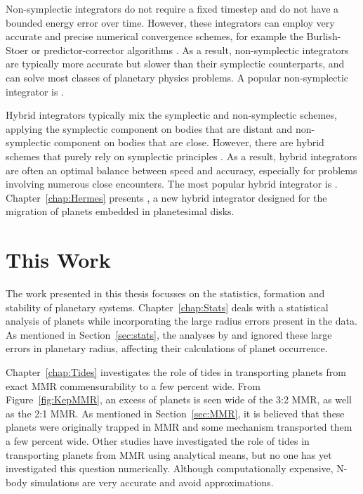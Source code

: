 Non-symplectic integrators do not require a fixed timestep and do not have a bounded energy error over time. 
However, these integrators can employ very accurate and precise numerical convergence schemes, for example the Burlish-Stoer or predictor-corrector algorithms \citep{Press2002}.
As a result, non-symplectic integrators are typically more accurate but slower than their symplectic counterparts, and can solve most classes of planetary physics problems. 
A popular non-symplectic integrator is \ias \citep{Rein2015a}.

Hybrid integrators typically mix the symplectic and non-symplectic schemes, applying the symplectic component on bodies that are distant and non-symplectic component on bodies that are close. 
However, there are hybrid schemes that purely rely on symplectic principles \citep[e.g.][]{Duncan1998}.
As a result, hybrid integrators are often an optimal balance between speed and accuracy, especially for problems involving numerous close encounters. 
The most popular hybrid integrator is \mercury \citep{Chambers1999}.
Chapter~\ref{chap:Hermes} presents \hermes, a new hybrid integrator designed for the migration of planets embedded in planetesimal disks. 

\section{This Work}
The work presented in this thesis focusses on the statistics, formation and stability of planetary systems. 
Chapter~\ref{chap:Stats} deals with a statistical analysis of \kep planets while incorporating the large radius errors present in the \kep data. 
As mentioned in Section~\ref{sec:stats}, the analyses by \citet{Fressin2013} and \citet{Petigura2013} ignored these large errors in planetary radius, affecting their calculations of planet occurrence.

Chapter~\ref{chap:Tides} investigates the role of tides in transporting planets from exact MMR commensurability to a few percent wide. 
From Figure~\ref{fig:KepMMR}, an excess of planets is seen wide of the 3:2 MMR, as well as the 2:1 MMR. 
As mentioned in Section~\ref{sec:MMR}, it is believed that these planets were originally trapped in MMR and some mechanism transported them a few percent wide. 
Other studies have investigated the role of tides in transporting planets from MMR using analytical \citep{Lee2013, Delisle2014} means, but no one has yet investigated this question numerically.
Although computationally expensive, N-body simulations are very accurate and avoid approximations. 

